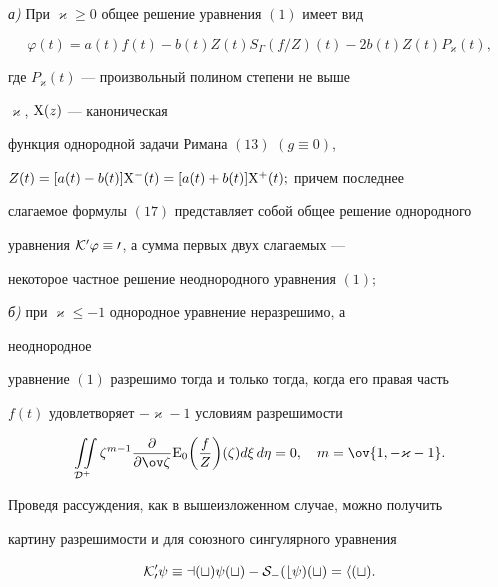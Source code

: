 \begin{thm}


{\em а)} При $\varkappa\ge 0$ общее решение уравнения $(1)$ имеет вид


\begin{equation}


\varphi(t)=a(t)f(t)-b(t)Z(t)S_\Gamma(f/Z)(t)-


2b(t)Z(t)P_\varkappa(t),


\end{equation}


где $P_\varkappa(t)$ --- произвольный полином степени не выше


$\varkappa$, $\mathrm{X} (z)$ --- каноническая


функция однородной задачи Римана $(13)$ $(g\equiv0)$,


$Z(t)=[a(t)-b(t)]\mathrm{X}^-(t)=[a(t)+b(t)]\mathrm{X}^+(t);$ причем последнее


слагаемое формулы $(17)$ представляет собой общее решение однородного


уравнения $\cal K^0\varphi\equiv 0$, а сумма первых двух слагаемых ---


некоторое частное решение неоднородного уравнения $(1);$





{\em б)} при $\varkappa\le -1$ однородное уравнение неразрешимо, а


неоднородное


уравнение $(1)$ разрешимо тогда и только тогда, когда его правая часть


$f(t)$ удовлетворяет $-\varkappa-1$ условиям разрешимости


$$


\iint\limits_{\cal D^+}\zeta^{m-1}\frac{\partial}{\partial\ov\zeta}


\E_0\biggl(\frac{f}{Z}\biggr)(\zeta)d\xi\,d\eta=0,\quad


m=\ov{1,-\varkappa-1}.


$$


\end{thm}





\begin{note}


Проведя рассуждения, как в вышеизложенном случае, можно получить


картину разрешимости и для союзного сингулярного уравнения


$$


\cal K'_0\psi\equiv a(t)\psi(t)-


S_\Gamma(b\psi)(t)=h(t).


$$


\end{note}





